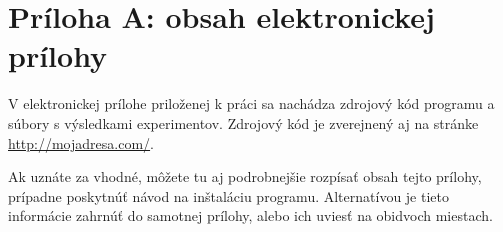 \chapter*{Príloha A: obsah elektronickej prílohy}

V elektronickej prílohe priloženej k práci sa nachádza zdrojový kód
programu a súbory s výsledkami experimentov. Zdrojový kód je
zverejnený aj na stránke \url{http://mojadresa.com/}.

Ak uznáte za vhodné, môžete tu aj podrobnejšie rozpísať obsah tejto
prílohy, prípadne poskytnúť návod na inštaláciu programu. Alternatívou
je tieto informácie zahrnúť do samotnej prílohy, alebo ich uviesť na
obidvoch miestach.
